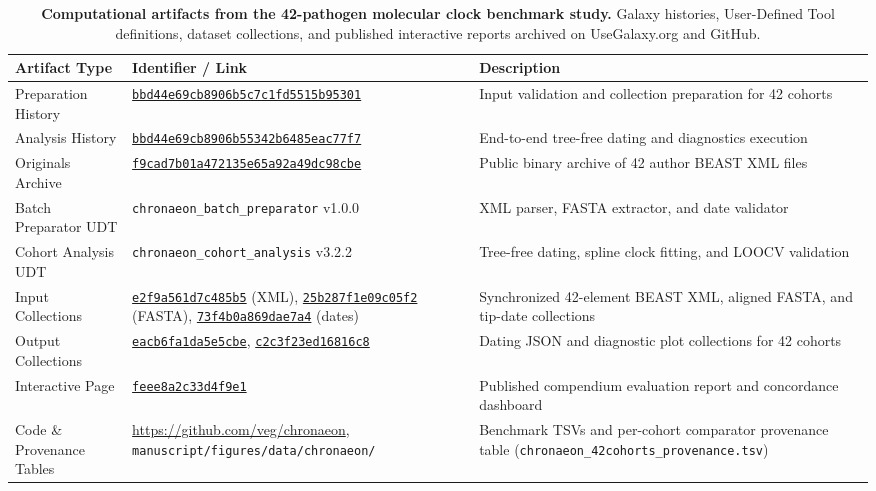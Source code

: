 \documentclass[11pt,letterpaper]{article}
\begin{document}
\clearpage

\begin{table}[!htbp]
\centering
\footnotesize
\begin{tabularx}{\textwidth}{p{}p{}X}
\toprule
\textbf{Artifact Type} & \textbf{Identifier / Link} & \textbf{Description} \\
\midrule
Preparation History & \href{https://usegalaxy.org/histories/view?id=bbd44e69cb8906b5c7c1fd5515b95301}{\texttt{bbd44e69cb8906b5c7c1fd5515b95301}} & Input validation and collection preparation for 42 cohorts \\
Analysis History & \href{https://usegalaxy.org/histories/view?id=bbd44e69cb8906b55342b6485eac77f7}{\texttt{bbd44e69cb8906b55342b6485eac77f7}} & End-to-end tree-free dating and diagnostics execution \\
Originals Archive & \href{https://usegalaxy.org/datasets/f9cad7b01a472135e65a92a49dc98cbe}{\texttt{f9cad7b01a472135e65a92a49dc98cbe}} & Public binary archive of 42 author BEAST XML files \\
Batch Preparator UDT & \texttt{chronaeon\_batch\_preparator} v1.0.0 & XML parser, FASTA extractor, and date validator \\
Cohort Analysis UDT & \texttt{chronaeon\_cohort\_analysis} v3.2.2 & Tree-free dating, spline clock fitting, and LOOCV validation \\
Input Collections & \href{https://usegalaxy.org/histories/view?id=bbd44e69cb8906b5c7c1fd5515b95301}{\texttt{e2f9a561d7c485b5}} (XML), \href{https://usegalaxy.org/histories/view?id=bbd44e69cb8906b5c7c1fd5515b95301}{\texttt{25b287f1e09c05f2}} (FASTA), \href{https://usegalaxy.org/histories/view?id=bbd44e69cb8906b5c7c1fd5515b95301}{\texttt{73f4b0a869dae7a4}} (dates) & Synchronized 42-element BEAST XML, aligned FASTA, and tip-date collections \\
Output Collections & \href{https://usegalaxy.org/histories/view?id=bbd44e69cb8906b55342b6485eac77f7}{\texttt{eacb6fa1da5e5cbe}}, \href{https://usegalaxy.org/histories/view?id=bbd44e69cb8906b55342b6485eac77f7}{\texttt{c2c3f23ed16816c8}} & Dating JSON and diagnostic plot collections for 42 cohorts \\
Interactive Page & \href{https://usegalaxy.org/published/page?id=feee8a2c33d4f9e1}{\texttt{feee8a2c33d4f9e1}} & Published compendium evaluation report and concordance dashboard \\
Code \& Provenance Tables & \url{https://github.com/veg/chronaeon}, \nolinkurl{manuscript/figures/data/chronaeon/} & Benchmark TSVs and per-cohort comparator provenance table (\nolinkurl{chronaeon_42cohorts_provenance.tsv}) \\
\bottomrule
\end{tabularx}
\caption{\textbf{Computational artifacts from the 42-pathogen molecular clock benchmark study.} Galaxy histories, User-Defined Tool definitions, dataset collections, and published interactive reports archived on UseGalaxy.org and GitHub.}
\label{tab:case3_artifacts}
\end{table}
\end{document}
